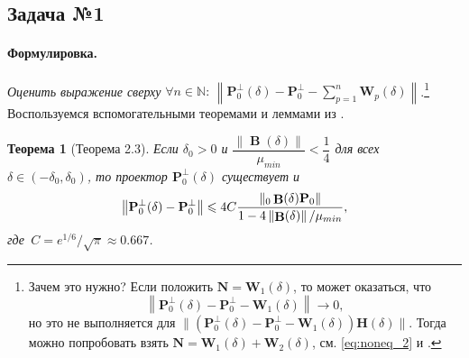 \documentclass[specialist,
substylefile = spbu_report.rtx,
subf,href,colorlinks=true, 12pt]{disser}
\newcommand\norm[1]{\left\|#1\right\|}
\let\S\relax
\DeclareMathOperator\S{\mathbf{S}}
\DeclareMathOperator\B{\mathbf{B}}
\newtheorem{theorem}{Теорема}
\newenvironment{formulation}{\paragraph{Формулировка.}}{\hfill}
\begin{document}
	\subsection{Задача №1}
	\begin{formulation}
		\emph{Оценить выражение сверху }$\forall n\in\mathbb{N}:\,\norm{\mathbf{P}_0^\bot(\delta) - \mathbf{P}_0^\bot - \sum\limits^n_{p=1}\mathbf{W}_p(\delta)}$.\footnote{Зачем это нужно? Если положить $\mathbf{N}=\mathbf{W}_1(\delta)$, то может оказаться, что 
			\begin{equation*}
				\norm{\mathbf{P}_0^\bot(\delta) - \mathbf{P}_0^\bot - \mathbf{W}_1(\delta)}\to 0,
			\end{equation*}
			но это не выполняется для $\|(\mathbf{P}_0^\bot(\delta) - \mathbf{P}_0^\bot - \mathbf{W}_1(\delta))\mathbf{H}(\delta)\|$.
			Тогда можно попробовать взять $\mathbf{N}=\mathbf{W}_1(\delta)+\mathbf{W}_2(\delta)$, см. \eqref{eq:noneq_2} и \cite{ZNekrutkin}.}
	\end{formulation}
	\\
	Воспользуемся вспомогательными теоремами и леммами из \cite{Nekrutkin10}.
	\begin{theorem}[Теорема 2.3]
		\label{th:1}
		\rm \emph{Если} $\delta_0 > 0$ \emph{и} $\dfrac{\norm{\B(\delta)}}{\mu_{min}} < \dfrac{1}{4}$ \emph{для всех} $\delta \in (-\delta_0, \delta_0)$\emph{, то проектор} $\mathbf{P}^\bot_0(\delta)$ \emph{существует и} \begin{equation}\norm{\mathbf{P}_0^\bot(\delta) - \mathbf{P}_0^\bot} \leqslant 4C\dfrac{\norm{\S_0\B(\delta)\mathbf{P}_0}}{1 - 4\norm{\B(\delta)}/\mu_{min}}\label{eq:6},
		\end{equation}
		\emph{где} $\,C = e^{1/6}/\sqrt{\pi}\approx0.667$.
	\end{theorem}%
	
\end{document}
